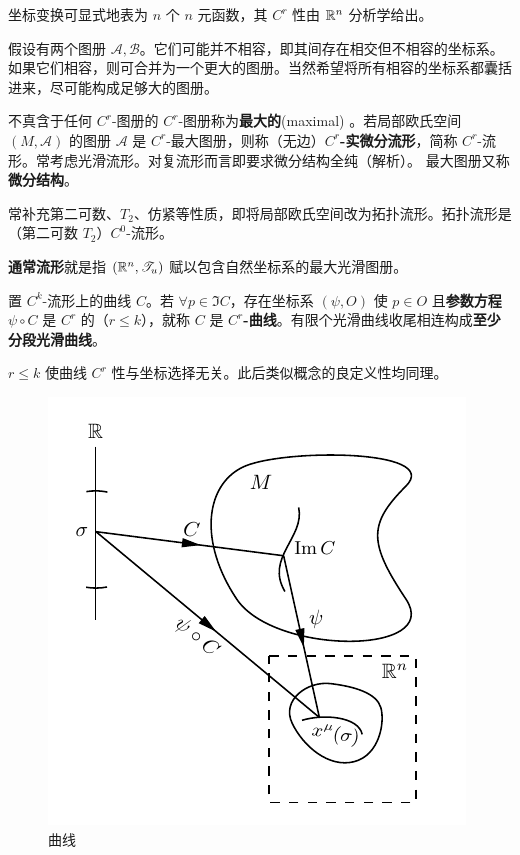 \begin{remark}
    坐标变换可显式地表为 $n$ 个 $n$ 元函数，其 $C^r$ 性由 $\mathbb{R}^n$ 分析学给出。
\end{remark}

假设有两个图册 $\mathcal A,\mathcal B$。它们可能并不相容，即其间存在相交但不相容的坐标系。如果它们相容，则可合并为一个更大的图册。当然希望将所有相容的坐标系都囊括进来，尽可能构成足够大的图册。

\begin{definition}
    不真含于任何 $C^r$-图册的 $C^r$-图册称为\textbf{最大的}(maximal) 。若局部欧氏空间 $(M,\mathcal A)$ 的图册 $\mathcal A$ 是 $C^r$-最大图册，则称（无边）\textbf{$C^r$-实微分流形}，简称 $C^r$-流形。常考虑光滑流形。对复流形而言即要求微分结构全纯（解析）。
    最大图册又称\textbf{微分结构}。
\end{definition}

\begin{remark}
    常补充第二可数、$T_2$、仿紧等性质，即将局部欧氏空间改为拓扑流形。拓扑流形是（第二可数 $T_2$）$C^0$-流形。
\end{remark}

\begin{eg}
    \textbf{通常流形}就是指 $(\mathbb{R}^n,\mathscr T_u)$ 赋以包含自然坐标系的最大光滑图册。
\end{eg}

\begin{definition}
    置 $C^k$-流形上的曲线 $C$。若 $\forall p\in \Im C$，存在坐标系 $(\psi,O)$ 使 $p\in O$ 且\textbf{参数方程} $\psi\circ C$ 是 $C^r$ 的（$r\leqslant k$），就称 $C$ 是 $C^r$\textbf{-曲线}。有限个光滑曲线收尾相连构成\textbf{至少分段光滑曲线}。
\end{definition}

\begin{remark}
    $r\leqslant k$ 使曲线 $C^r$ 性与坐标选择无关。此后类似概念的良定义性均同理。
\end{remark}

\begin{figure}[ht]
    \centering
    \includegraphics[width=.4\textwidth]{fig/appx/curve.pdf}
    \caption{曲线}
\end{figure}

